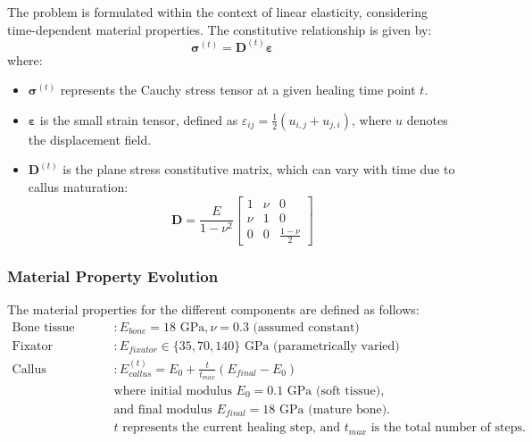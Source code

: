 \documentclass{article}
\begin{document}
The problem is formulated within the context of linear elasticity, considering time-dependent material properties. The constitutive relationship is given by:
\[
  \bm{\sigma}^{(t)} = \mathbf{D}^{(t)}\bm{\varepsilon}
\]
where:
\begin{itemize}
  \item $\bm{\sigma}^{(t)}$ represents the Cauchy stress tensor at a given healing time point $t$.
  \item $\bm{\varepsilon}$ is the small strain tensor, defined as $\varepsilon_{ij} = \frac{1}{2}(u_{i,j} + u_{j,i})$, where $u$ denotes the displacement field.
  \item $\mathbf{D}^{(t)}$ is the plane stress constitutive matrix, which can vary with time due to callus maturation:
        \[
          \mathbf{D} = \frac{E}{1-\nu^2}\begin{bmatrix}
            1   & \nu & 0               \\
            \nu & 1   & 0               \\
            0   & 0   & \frac{1-\nu}{2}
          \end{bmatrix}
        \]
\end{itemize}

\subsubsection{Material Property Evolution}
The material properties for the different components are defined as follows:
\begin{align*}
  \text{Bone tissue (cortical)} & : E_{bone} = 18 \text{ GPa}, \nu = 0.3 \text{ (assumed constant)}                                 \\
  \text{Fixator}                & : E_{fixator} \in \{35, 70, 140\} \text{ GPa (parametrically varied)}                             \\
  \text{Callus}                 & : E_{callus}^{(t)} = E_0 + \frac{t}{t_{max}}(E_{final}-E_0)                                       \\
                                & \text{where initial modulus } E_0 = 0.1 \text{ GPa (soft tissue),}                                \\
                                & \text{and final modulus } E_{final} = 18 \text{ GPa (mature bone).}                               \\
                                & t \text{ represents the current healing step, and } t_{max} \text{ is the total number of steps.}
\end{align*}
\end{document}
